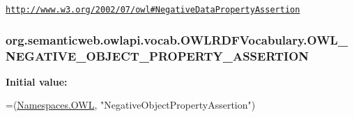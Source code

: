 \href{http://www.w3.org/2002/07/owl#NegativeDataPropertyAssertion}{\tt http\-://www.\-w3.\-org/2002/07/owl\#\-Negative\-Data\-Property\-Assertion} \hypertarget{enumorg_1_1semanticweb_1_1owlapi_1_1vocab_1_1_o_w_l_r_d_f_vocabulary_ac76a6ed7effd7c406e6a8e4f7c319582}{
\subsubsection[{O\-W\-L\-\_\-\-N\-E\-G\-A\-T\-I\-V\-E\-\_\-\-O\-B\-J\-E\-C\-T\-\_\-\-P\-R\-O\-P\-E\-R\-T\-Y\-\_\-\-A\-S\-S\-E\-R\-T\-I\-O\-N}]{\setlength{\rightskip}{0pt plus 5cm}org.\-semanticweb.\-owlapi.\-vocab.\-O\-W\-L\-R\-D\-F\-Vocabulary.\-O\-W\-L\-\_\-\-N\-E\-G\-A\-T\-I\-V\-E\-\_\-\-O\-B\-J\-E\-C\-T\-\_\-\-P\-R\-O\-P\-E\-R\-T\-Y\-\_\-\-A\-S\-S\-E\-R\-T\-I\-O\-N}}\label{enumorg_1_1semanticweb_1_1owlapi_1_1vocab_1_1_o_w_l_r_d_f_vocabulary_ac76a6ed7effd7c406e6a8e4f7c319582}
{\bfseries Initial value\-:}
\begin{DoxyCode}
=(\hyperlink{enumorg_1_1semanticweb_1_1owlapi_1_1vocab_1_1_namespaces_a2fcb537074d9307ef1356ffb6a5bd6f4}{Namespaces.OWL},
            \textcolor{stringliteral}{"NegativeObjectPropertyAssertion"})
\end{DoxyCode}
